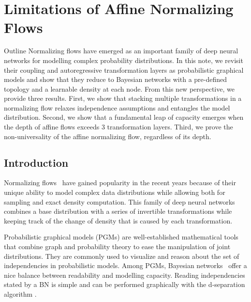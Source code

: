 \chapter{Limitations of Affine Normalizing Flows}\label{ch:04}

\begin{remark}{Outline}
Normalizing flows have emerged as an important family of deep neural networks for modelling complex probability distributions.
In this note, we revisit their coupling and autoregressive transformation layers as probabilistic graphical models and show that they reduce to Bayesian networks  with a pre-defined topology and a learnable density at each node.
From this new perspective, we provide three results.
First, we show that stacking multiple transformations in a normalizing flow relaxes independence assumptions and entangles the model distribution.
Second, we show that a fundamental leap of capacity emerges when the depth of affine flows exceeds 3 transformation layers.
Third, we prove the non-universality of the affine normalizing flow, regardless of its depth.
\end{remark}
\section{Introduction}
Normalizing flows~\citep[NF, ][]{rezende2015variational} have gained popularity in the recent years because of their unique ability to model complex data distributions while allowing both for sampling and exact density computation.
This family of deep neural networks combines a base distribution with a series of invertible transformations while keeping track of the change of density that is caused by each transformation.



Probabilistic graphical models (PGMs) are well-established mathematical tools that combine graph and probability theory to ease the manipulation of joint distributions. They are commonly used to visualize and reason about the set of independencies in probabilistic models.
Among PGMs, Bayesian networks~\citep[BN, ][]{pearl_bayesian_2011} offer a nice balance between readability and modelling capacity. Reading independencies stated by a BN is simple and can be performed graphically with the d-separation algorithm \citep{geiger_d-separation_1990}. %

